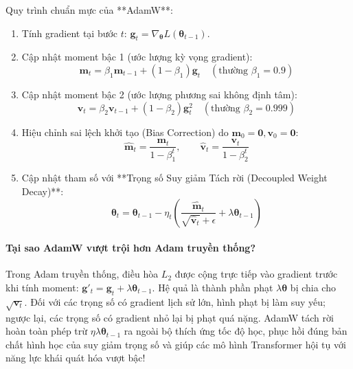 Quy trình chuẩn mực của **AdamW**:
\begin{enumerate}
  \item Tính gradient tại bước $t$: $\mathbf{g}_t = \nabla_{\boldsymbol{\theta}} L(\boldsymbol{\theta}_{t-1})$.
  \item Cập nhật moment bậc 1 (ước lượng kỳ vọng gradient):
  \begin{equation}
  \mathbf{m}_t = \beta_1 \mathbf{m}_{t-1} + (1 - \beta_1) \mathbf{g}_t \quad (\text{thường } \beta_1 = 0.9)
  \end{equation}
  \item Cập nhật moment bậc 2 (ước lượng phương sai không định tâm):
  \begin{equation}
  \mathbf{v}_t = \beta_2 \mathbf{v}_{t-1} + (1 - \beta_2) \mathbf{g}_t^2 \quad (\text{thường } \beta_2 = 0.999)
  \end{equation}
  \item Hiệu chỉnh sai lệch khởi tạo (Bias Correction) do $\mathbf{m}_0 = \mathbf{0}, \mathbf{v}_0 = \mathbf{0}$:
  \begin{equation}
  \hat{\mathbf{m}}_t = \frac{\mathbf{m}_t}{1 - \beta_1^t}, \qquad \hat{\mathbf{v}}_t = \frac{\mathbf{v}_t}{1 - \beta_2^t}
  \end{equation}
  \item Cập nhật tham số với **Trọng số Suy giảm Tách rời (Decoupled Weight Decay)**:
  \begin{equation}
  \boldsymbol{\theta}_t = \boldsymbol{\theta}_{t-1} - \eta_t \left( \frac{\hat{\mathbf{m}}_t}{\sqrt{\hat{\mathbf{v}}_t} + \epsilon} + \lambda \boldsymbol{\theta}_{t-1} \right)
  \end{equation}
\end{enumerate}

\paragraph{Tại sao AdamW vượt trội hơn Adam truyền thống?}
Trong Adam truyền thống, điều hòa $L_2$ được cộng trực tiếp vào gradient trước khi tính moment: $\mathbf{g}'_t = \mathbf{g}_t + \lambda \boldsymbol{\theta}_{t-1}$. Hệ quả là thành phần phạt $\lambda \boldsymbol{\theta}$ bị chia cho $\sqrt{\mathbf{v}_t}$. Đối với các trọng số có gradient lịch sử lớn, hình phạt bị làm suy yếu; ngược lại, các trọng số có gradient nhỏ lại bị phạt quá nặng. AdamW tách rời hoàn toàn phép trừ $\eta \lambda \boldsymbol{\theta}_{t-1}$ ra ngoài bộ thích ứng tốc độ học, phục hồi đúng bản chất hình học của suy giảm trọng số và giúp các mô hình Transformer hội tụ với năng lực khái quát hóa vượt bậc!

